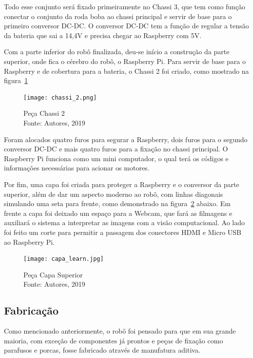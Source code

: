 Todo esse conjunto será fixado primeiramente no Chassi 3, que tem como função conectar o conjunto da roda boba ao chassi principal e servir de base para o primeiro conversor DC-DC. O conversor DC-DC tem a função de regular a tensão da bateria que sai a 14,4V e precisa chegar ao Raspberry com 5V.

Com a parte inferior do robô finalizada, deu-se início a construção da parte superior, onde fica o cérebro do robô, o Raspberry Pi. Para servir de base para o Raspberry e de cobertura para a bateria, o Chassi 2 foi criado, como mostrado na figura~\ref{fig:chassi_2}

\begin{figure}[h!]
	\centering
	\texttt{[image: chassi\_2.png]}\\
	\caption{Peça Chassi 2 \\ Fonte: Autores, 2019}
	\label{fig:chassi_2}
\end{figure}

Foram alocados quatro furos para segurar a Raspberry, dois furos para o segundo conversor DC-DC e mais quatro furos para a fixação no chassi principal. O Raspberry Pi funciona como um mini computador, o qual terá os códigos e informações necessárias para acionar os
motores. 

Por fim, uma capa foi criada para proteger a Raspberry e o conversor da parte superior, além de dar um aspecto moderno ao robô, com linhas diagonais simulando uma seta para frente, como demonstrado na figura~\ref{fig:capa_learn} abaixo. Em frente a capa foi deixado um espaço para a Webcam, que fará as filmagens e auxiliará o sistema a interpretar as imagens com a visão computacional. Ao lado foi feito um corte para permitir a passagem dos conectores HDMI e Micro USB ao Raspberry Pi.

\begin{figure}[h!]
	\centering
	\texttt{[image: capa\_learn.jpg]}\\
	\caption{Peça Capa Superior \\ Fonte: Autores, 2019}
	\label{fig:capa_learn}
\end{figure}

\subsection{Fabricação}
Como mencionado anteriormente, o robô foi pensado para que em sua grande maioria, com exceção de componentes já prontos e peças de fixação como parafusos e porcas, fosse fabricado através de manufatura aditiva.

